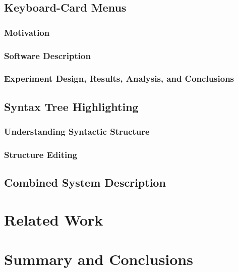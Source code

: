 \documentclass[phd,appendix]{uithesis}
\begin{document}
\section{Keyboard-Card Menus}

  \subsection{Motivation}

  \subsection{Software Description}

  \subsection{Experiment Design, Results, Analysis, and Conclusions}

\section{Syntax Tree Highlighting}

  \subsection{Understanding Syntactic Structure}

  \subsection{Structure Editing}
  
\section{Combined System Description}


\chapter{Related Work}

\chapter{Summary and Conclusions}
\end{document}
